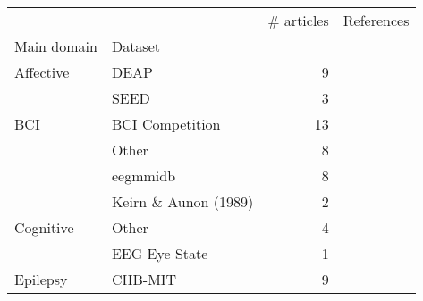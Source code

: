 \begin{tabular}{llrl}
\toprule
      &       &  \# articles &                                                                                                                                                                  References \\
Main domain & Dataset &              &                                                                                                                                                                             \\
\midrule
Affective & DEAP &            9 &                                                            \cite{Li2018, Alhagry2017, BenSaid2017a, Lin2017, Xu2016, Liu2016, Frydenlund2015, Jirayucharoensak2014, Li2013} \\
      & SEED &            3 &                                                                                                                                        \cite{Zhang2018, Liu2016, Zheng2015} \\
BCI & BCI Competition &           13 &  \cite{Gao2018, Lawhern2018, Sakhavi2017, Schirrmeister2017, Schirrmeister2017, Tabar2016a, Tabar2016a, Manor2015, Sakhavi2015, Yang2015a, Ding2015, Ding2015, Cecotti2011} \\
      & Other &            8 &                                                        \cite{Hasib2018, Lawhern2018, Schirrmeister2017, Hajinoroozi2017, Hajinoroozi2017, Hajinoroozi2017, Sun2016, An2016} \\
      & eegmmidb &            8 &                                                                    \cite{Zhang2018c, Major2017, Zhang2017g, Zhang2017d, Zhang2017a, Dharamsi2017, Normand2015, Alomari2013} \\
      & Keirn \& Aunon (1989) &            2 &                                                                                                                                           \cite{Padmanabh2017, Patnaik2017} \\
Cognitive & Other &            4 &                                                                                                        \cite{Kuanar2018, Hajinoroozi2015, Hajinoroozi2015, Hajinoroozi2015} \\
      & EEG Eye State &            1 &                                                                                                                                                           \cite{Narejo2016} \\
Epilepsy & CHB-MIT &            9 &                                                           \cite{Yan2018, Tsiouris2018, Yuan2018a, Truong2018, Truong2018a, Page2016, Thodoroff2016, Pramod2015, Turner2014} \\

\end{tabular}

